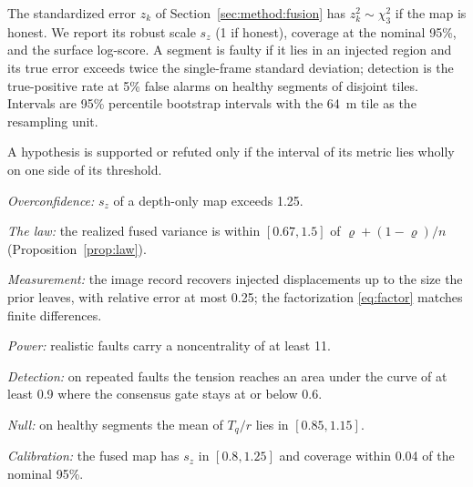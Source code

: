  The standardized error $z_k$ of Section~\ref{sec:method:fusion} has $z_k^2\sim\chi^2_3$
if the map is honest. We report its robust scale $s_z$ (1 if honest), coverage at the nominal 95\%, and
the surface log-score. A segment is faulty if it lies in an injected region and its true error exceeds
twice the single-frame standard deviation; detection is the true-positive rate at 5\% false alarms on
healthy segments of disjoint tiles. Intervals are 95\% percentile bootstrap intervals with the 64~m tile
as the resampling unit.

 A hypothesis is supported or refuted only if the interval of its metric lies wholly on
one side of its threshold.
\begin{description}\setlength{\itemsep}{1pt}
  \item[H1] \emph{Overconfidence:} $s_z$ of a depth-only map exceeds 1.25.
  \item[H2] \emph{The law:} the realized fused variance is within $[0.67,1.5]$ of
        $\varrho+(1-\varrho)/n$ (Proposition~\ref{prop:law}).
  \item[H3] \emph{Measurement:} the image record recovers injected displacements up to the size the prior
        leaves, with relative error at most 0.25; the factorization \eqref{eq:factor} matches finite
        differences.
  \item[H4] \emph{Power:} realistic faults carry a noncentrality of at least 11.
  \item[H5] \emph{Detection:} on repeated faults the tension reaches an area under the curve of at
        least 0.9 where the consensus gate stays at or below 0.6.
  \item[H6] \emph{Null:} on healthy segments the mean of $T_q/r$ lies in $[0.85,1.15]$.
  \item[H7] \emph{Calibration:} the fused map has $s_z$ in $[0.8,1.25]$ and coverage within 0.04 of the
        nominal 95\%.
\end{description}
